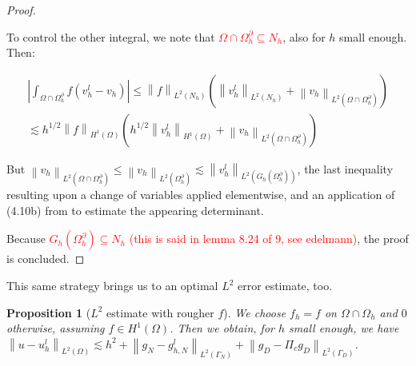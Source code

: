 \documentclass[english,a4paper,10pt,oneside]{scrbook}	%
\theoremstyle{break}
\newtheorem{prop}[equation]{Proposition}
\newenvironment{mproof}[1][\proofname]{%
  \begin{proof}[#1]$ $\par\nobreak\ignorespaces
}{%
  \end{proof}
}
\renewcommand*{\proofname}{Proof}
\theoremstyle{remark}
\newcommand{\norm}[1]{\left\lVert#1\right\rVert}
\begin{document}
\begin{mproof}
To control the other integral, we note that \textcolor{red}{$\Omega \cap \Omega_h^\partial \subseteq N_h$}, also for $h$ small enough. Then:

\begin{align*}
\left | \int_{\Omega \cap \Omega_h^\partial} f (v_h^l - v_h) \right | \leq \norm{f}_{L^2(N_h)}( \norm{v_h^l}_{L^2(N_h)} + \norm{v_h}_{L^2(\Omega \cap \Omega_h^\partial)})\\ \lesssim h^{1/2} \norm{f}_{H^1(\Omega)} ( h^{1/2}\norm{v_h^l}_{H^1(\Omega)}+ \norm{v_h}_{L^2(\Omega \cap \Omega_h^\partial)})
\end{align*} 

But $\norm{v_h}_{L^2(\Omega \cap \Omega_h^\partial)} \leq \norm{v_h}_{L^2(\Omega_h^\partial)} \lesssim \norm{v_h^l}_{L^2(G_h(\Omega_h^\partial))}$, the last inequality resulting upon a change of variables applied elementwise, and an application of (4.10b) from \cite{elliott} to estimate the appearing determinant.

Because \textcolor{red}{$G_h(\Omega_h^\partial)\subseteq N_h$ (this is said in lemma 8.24 of 9, see edelmann)}, the proof is concluded.

\end{mproof}

This same strategy brings us to an optimal $L^2$ error estimate, too.

\begin{prop}[$L^2$ estimate with rougher $f$]
\label{prop:rough_L2_est_ell}
We choose $f_h=f $ on $\Omega \cap \Omega_h$ and $0$ otherwise, assuming $f \in H^1(\Omega)$. Then we obtain, for $h$ small enough, we have $\norm{u-u_h^l}_{L^2(\Omega)}\lesssim h^{2} + \norm{g_N-g_{h,N}^l}_{L^2(\Gamma_N)} + \norm{g_D - \Pi_c g_D}_{L^2(\Gamma_D)}$.
\end{prop}
\end{document}
